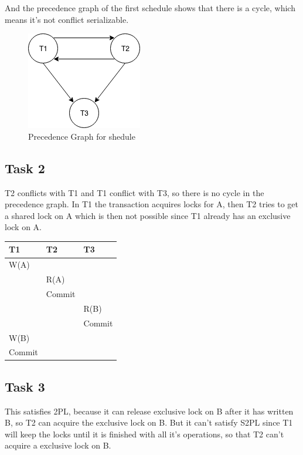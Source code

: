 \documentclass[12pt,a4paper]{article}
\begin{document}
And the precedence graph of the first schedule shows that there is a cycle, which means it's not conflict serializable.
\begin{figure}
	\center
	\includegraphics{img/Q1-task1}
	\caption{Precedence Graph for shedule}
\end{figure}

\subsection{Task 2}
T2 conflicts with T1 and T1 conflict with T3, so there is no cycle in the precedence graph.
In T1 the transaction acquires locks for A, then T2 tries to get a shared lock on A which is then not possible since T1 already has an exclusive lock on A.
\begin{table}[!htbp]
    \centering
    \begin{tabularx}{\textwidth}{l|l|l}
        \hline
        T1 & T2 & T3 \\ 
        \hline
        W(A)   &  	    &   			\\
        	   & R(A)   & 			\\
         	   & Commit & 			\\        
               &        &  R(B) 		\\
               &		&  Commit	\\
        W(B)   & 		& 			\\
        Commit & 		& 			\\     
        \hline
    \end{tabularx}
\end{table}

\newpage
\subsection{Task 3}
This satisfies 2PL, because it can release exclusive lock on B after it has written B, so T2 can acquire the exclusive lock on B.
But it can't satisfy S2PL since T1 will keep the locks until it is finished with all it's operations, so that T2 can't acquire a exclusive lock on B.
\end{document}

